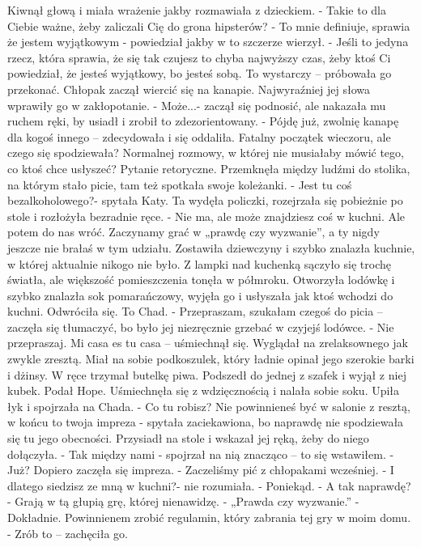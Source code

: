 \documentclass[12pt,a4paper]{book}
\begin{document}
Kiwnął głową i miała wrażenie jakby rozmawiała z dzieckiem. 
- Takie to dla Ciebie ważne, żeby zaliczali Cię do grona hipsterów? 
- To mnie definiuje, sprawia że jestem wyjątkowym - powiedział jakby w to szczerze wierzył.
- Jeśli to jedyna rzecz, która sprawia, że się tak czujesz to chyba najwyższy czas, żeby ktoś Ci powiedział, że jesteś wyjątkowy, bo jesteś sobą. To wystarczy – próbowała go przekonać. 
Chłopak zaczął wiercić się na kanapie. Najwyraźniej jej słowa wprawiły go w zakłopotanie. 
- Może...- zaczął się podnosić, ale nakazała mu ruchem ręki, by usiadł i zrobił to zdezorientowany.
- Pójdę już, zwolnię kanapę dla kogoś innego – zdecydowała i się oddaliła. 
Fatalny początek wieczoru, ale czego się spodziewała? Normalnej rozmowy, w której nie musiałaby mówić tego, co ktoś chce usłyszeć? 
Pytanie retoryczne. Przemknęła między ludźmi do stolika, na którym stało picie, tam też spotkała swoje koleżanki. 
- Jest tu coś bezalkoholowego?- spytała Katy. 
Ta wydęła policzki, rozejrzała się pobieżnie po stole i rozłożyła bezradnie ręce.
- Nie ma, ale może znajdziesz coś w kuchni. Ale potem do nas wróć. Zaczynamy grać w „prawdę czy wyzwanie”, a ty nigdy jeszcze nie brałaś w tym udziału. 
Zostawiła dziewczyny i szybko znalazła kuchnie, w której aktualnie nikogo nie było. Z lampki nad kuchenką sączyło się trochę światła, ale większość pomieszczenia tonęła w półmroku. Otworzyła lodówkę i szybko znalazła sok pomarańczowy, wyjęła go i usłyszała jak ktoś wchodzi do kuchni. Odwróciła się. To Chad. 
- Przepraszam, szukałam czegoś do picia – zaczęła się tłumaczyć, bo było jej niezręcznie grzebać w czyjejś lodówce.
- Nie przepraszaj. Mi casa es tu casa – uśmiechnął się. 
Wyglądał na zrelaksownego jak zwykle zresztą. Miał na sobie podkoszulek, który ładnie opinał jego szerokie barki i dżinsy. W ręce trzymał butelkę piwa. Podszedł do jednej z szafek i wyjął z niej kubek. Podał Hope. Uśmiechnęła się z wdzięcznością i nalała sobie soku. Upiła łyk i spojrzała na Chada.
- Co tu robisz? Nie powinnieneś być w salonie z resztą, w końcu to twoja impreza - spytała zaciekawiona, bo naprawdę nie spodziewała się tu jego obecności.
Przysiadł na stole i wskazał jej ręką, żeby do niego dołączyła. 
- Tak między nami - spojrzał na nią znacząco – to się wstawiłem.
- Już? Dopiero zaczęła się impreza.
- Zaczeliśmy pić z chłopakami wcześniej.
- I dlatego siedzisz ze mną w kuchni?- nie rozumiała. 
- Poniekąd. 
- A tak naprawdę?
- Grają w tą głupią grę, której nienawidzę. 
- „Prawda czy wyzwanie.”
- Dokładnie. Powinnienem zrobić regulamin, który zabrania tej gry w moim domu. 
- Zrób to  – zachęciła go.
\end{document}
